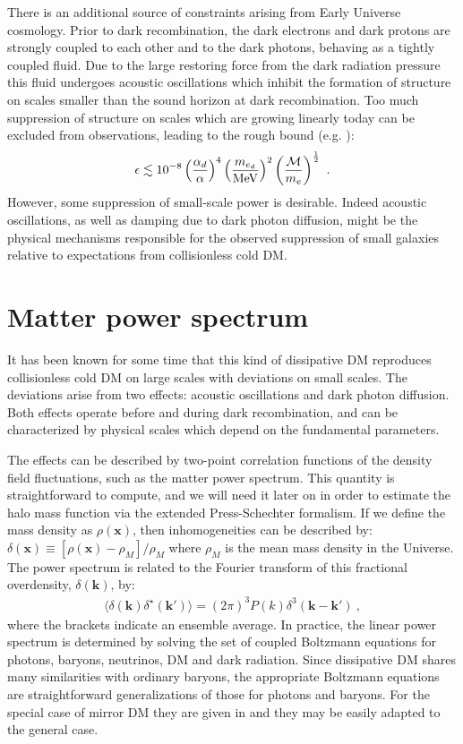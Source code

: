 \documentclass[12pt]{article}
\begin{document}
There is an additional source of constraints arising from Early Universe cosmology. Prior to dark recombination, 
the dark electrons and dark protons are strongly coupled to each other and to the dark photons, behaving as a tightly 
coupled fluid. 
Due to the large restoring force from the dark radiation pressure
this fluid undergoes acoustic oscillations which inhibit the formation of structure on scales smaller 
than the sound horizon at dark recombination. 
Too much suppression of structure on scales which are growing linearly today can 
be excluded from observations, leading to the rough bound (e.g. \cite{rich8,trodden,reviewadm}):
%
\begin{eqnarray}
\epsilon \lesssim 10 ^{-8} \left( \frac{\alpha_d}{\alpha} \right )^4
\left(\frac{m _{e_d}}{\rm MeV} \right)^2 \left ( \frac{{\cal M}}{m_e} \right)^{\frac{1}{2}} \ .
\label{boundse}
\end{eqnarray}
% 
However, some suppression of small-scale power is desirable. Indeed acoustic oscillations, as well as damping due to 
dark photon diffusion, might be the physical mechanisms responsible for the observed suppression of small galaxies relative to 
expectations from collisionless cold DM.

\section{Matter power spectrum}
\label{power}

It has been known for some time that this kind of dissipative DM reproduces collisionless cold DM on 
large scales with deviations on small scales. The deviations arise from two effects: acoustic oscillations and dark photon diffusion. 
Both effects operate before and during dark recombination, 
and can be characterized by physical scales which depend on the fundamental parameters.

The effects can be described by two-point correlation functions of the density field fluctuations, such as the 
matter power spectrum. This quantity is straightforward to compute, and we will need it later on in order to estimate the halo 
mass function via the extended Press-Schechter formalism. If we define the mass density as $\rho (\mathbf{x})$, then 
inhomogeneities can be described by: $\delta (\mathbf{x}) \equiv [\rho (\mathbf{x}) - \rho_M]/\rho_M$ where $\rho_M$ is the 
mean mass density in the Universe. The power spectrum is related to the Fourier transform of this fractional overdensity, $\delta (\mathbf{k})$, by:
%
\begin{eqnarray}
\langle \delta (\mathbf{k}) \delta ^{\star} (\mathbf{k'}) \rangle = (2\pi)^3P(k)\delta ^3 (\mathbf{k}-\mathbf{k'}) \ , 
\end{eqnarray}
%
where the brackets indicate an ensemble average. In practice, the linear power spectrum is determined by solving the set of 
coupled Boltzmann equations for photons, baryons, neutrinos, DM and dark radiation. Since dissipative DM shares many  
similarities with ordinary baryons, the appropriate Boltzmann equations are straightforward generalizations of those for photons 
and baryons. For the special case of mirror DM they are given in \cite{cmb2} and they may be easily adapted
to the general case.
\end{document}

